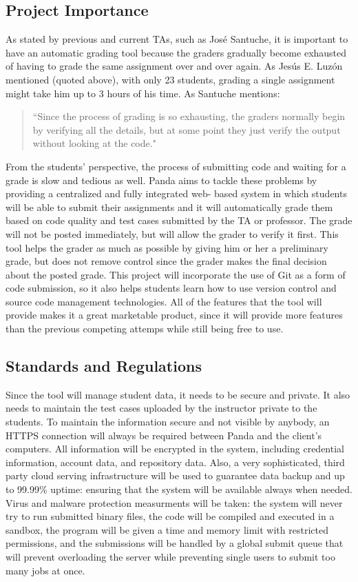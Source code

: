 \subsection{Project Importance}

As stated by previous and current TAs, such as José Santuche, it is important to
have an automatic grading tool because the graders gradually become exhausted of
having to grade the same assignment over and over again. As Jesús E. Luzón
mentioned (quoted above), with only 23 students, grading a single assignment
might take him up to 3 hours of his time. As Santuche mentions: \begin{quote}
``Since the process of grading is so exhausting, the graders normally begin by
verifying all the details, but at some point they just verify the output without
looking at the code." \end{quote} From the students' perspective, the process of
submitting code and waiting for a grade is slow and tedious as well. Panda aims
to tackle these problems by providing a centralized and fully integrated web-
based system in which students will be able to submit their assignments and it
will automatically grade them based on code quality and test cases submitted by
the TA or professor. The grade will not be posted immediately, but will allow
the grader to verify it first. This tool helps the grader as much as possible by
giving him or her a preliminary grade, but does not remove control since the
grader makes the final decision about the posted grade. This project will
incorporate the use of Git as a form of code submission, so it also helps
students learn how to use version control and source code management
technologies. All of the features that the tool will provide makes it a great
marketable product, since it will provide more features than the previous
competing attemps while still being free to use.

\subsection{Standards and Regulations} Since the tool will manage student data,
it needs to be secure and private. It also needs to maintain the test cases
uploaded by the instructor private to the students. To maintain the information
secure and not visible by anybody, an HTTPS connection will always be required
between Panda and the client's computers. All information will be encrypted in
the system, including credential information, account data, and repository data.
Also, a very sophisticated, third party cloud serving infrastructure will be
used to guarantee data backup and up to 99.99\% uptime: ensuring that the system
will be available always when needed. Virus and malware protection measurments
will be taken: the system will never try to run submitted binary files, the code
will be compiled and executed in a sandbox, the program will be given a time and
memory limit with restricted permissions, and the submissions will be handled by
a global submit queue that will prevent overloading the server while preventing
single users to submit too many jobs at once.
